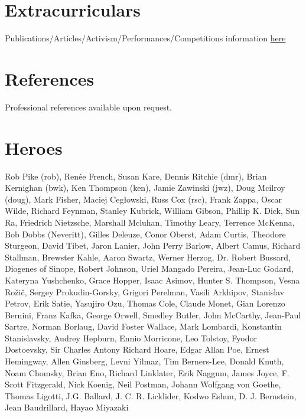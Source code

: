 \documentclass[11pt]{article}
\begin{document}
\section*{Extracurriculars}
Publications/Articles/Activism/Performances/Competitions information \href{http://cs.gettysburg.edu/~duncjo01/assets/about.html}{here}

\section*{References}
Professional references available upon request. 

\section*{Heroes}
Rob Pike (rob), Renée French, Susan Kare, Dennis Ritchie (dmr), Brian Kernighan (bwk), Ken Thompson (ken), Jamie Zawinski (jwz), Doug Mcilroy (doug), Mark Fisher, Maciej Cegłowski, Russ Cox (rsc), Frank Zappa, Oscar Wilde, Richard Feynman, Stanley Kubrick, William Gibson, Phillip K. Dick, Sun Ra, Friedrich Nietzsche, Marshall Mcluhan, Timothy Leary, Terrence McKenna, Bob Dobbs (Neveritt), Gilles Deleuze, Conor Oberst, Adam Curtis, Theodore Sturgeon, David Tibet, Jaron Lanier, John Perry Barlow, Albert Camus, Richard Stallman, Brewster Kahle, Aaron Swartz, Werner Herzog, Dr. Robert Bussard, Diogenes of Sinope, Robert Johnson, Uriel Mangado Pereira, Jean-Luc Godard, Kateryna Yushchenko, Grace Hopper, Isaac Asimov, Hunter S. Thompson, Vesna Rožič, Sergey Prokudin-Gorsky, Grigori Perelman, Vasili Arkhipov, Stanislav Petrov, Erik Satie, Yasujiro Ozu, Thomas Cole, Claude Monet, Gian Lorenzo Bernini, Franz Kafka, George Orwell, Smedley Butler, John McCarthy, Jean-Paul Sartre, Norman Borlaug, David Foster Wallace, Mark Lombardi, Konstantin Stanislavsky, Audrey Hepburn, Ennio Morricone, Leo Tolstoy, Fyodor Dostoevsky, Sir Charles Antony Richard Hoare, Edgar Allan Poe, Ernest Hemingway, Allen Ginsberg, Levni Yilmaz, Tim Berners-Lee, Donald Knuth, Noam Chomsky, Brian Eno, Richard Linklater, Erik Naggum, James Joyce, F. Scott Fitzgerald, Nick Koenig, Neil Postman, Johann Wolfgang von Goethe, Thomas Ligotti, J.G. Ballard, J. C. R. Licklider, Kodwo Eshun, D. J. Bernstein, Jean Baudrillard, Hayao Miyazaki 
\end{document}
